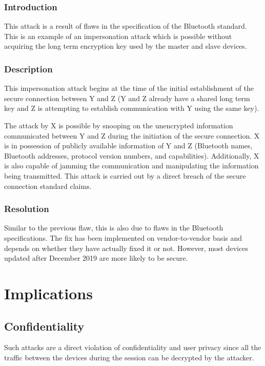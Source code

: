 \documentclass{article}
\begin{document}
\subsubsection{Introduction}
This attack is a result of flaws in the specification of the Bluetooth\texttrademark{} standard. This is an example of an impersonation attack which is possible without acquiring the long term encryption key used by the master and slave devices.\cite{bias}
\subsubsection{Description}
This impersonation attack begins at the time of the initial establishment of the secure connection between Y and Z (Y and Z already have a shared long term key and Z is attempting to establish communication with Y using the same key).\par
The attack by X is possible by snooping on the unencrypted information communicated between Y and Z during the initiation of the secure connection. X is in possession of publicly available information of Y and Z (Bluetooth\texttrademark{} names, Bluetooth\texttrademark{} addresses, protocol version numbers, and capabilities). Additionally, X is also capable of jamming the communication and manipulating the information being transmitted. This attack is carried out by a direct breach of the secure connection standard claims.\cite{bias}
\subsubsection{Resolution}
Similar to the previous flaw, this is also due to flaws in the Bluetooth\texttrademark{} specifications. The fix has been implemented on vendor-to-vendor basis and depends on whether they have actually fixed it or not. However, most devices updated after December 2019 are more likely to be secure.

\section{Implications}

\subsection{Confidentiality}
Such attacks are a direct violation of confidentiality and user privacy since all the traffic between the devices during the session can be decrypted by the attacker.
\end{document}
